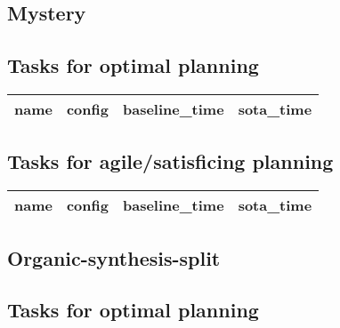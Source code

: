 \documentclass{article}
\begin{document}
                \newpage \subsection{Mystery}
                    \subsection*{Tasks for optimal planning}
                    
                            \begin{center}
                            \scriptsize
                            \begin{tabular}{@{}l|r|r|r@{}}
                            name & config & baseline\_time & sota\_time\\\midrule
                            
                            \end{tabular}
                            \end{center}
                    

                    \subsection*{Tasks for agile/satisficing planning}
                    
                            \begin{center}
                            \scriptsize
                            \begin{tabular}{@{}l|r|r|r@{}}
                            name & config & baseline\_time & sota\_time\\\midrule
                            
                            \end{tabular}
                            \end{center}
                    
                \newpage \subsection{Organic-synthesis-split}
                    \subsection*{Tasks for optimal planning}
                    
\end{document}
